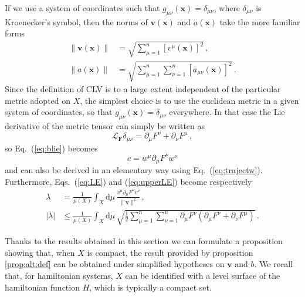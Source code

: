 \documentclass{article}
\theoremstyle{plain}
\theoremstyle{definition}
\theoremstyle{remark}
\newcommand{\vect}[1]{\boldsymbol{#1}}
\begin{document}
If we use a system of coordinates such that
$g_{\mu\nu}(\vect{x})=\delta_{\mu\nu}$, where $\delta_{\mu\nu}$ is
Kroenecker's symbol, then the norms of $\vect{v}(\vect{x})$ and
$a(\vect{x})$ take the more familiar forms
\begin{align}
\lVert \vect{v}(\vect{x})\rVert &= \sqrt{
\sum_{\mu=1}^n\left[v^\mu(\vect{x})\right]^2}\,, \label{eq:norme} \\
\lVert a(\vect{x})\rVert &= \sqrt{
\sum_{\mu=1}^n \sum_{\nu=1}^n
\left[a_{\mu\nu}(\vect{x})\right]^2}\,.
\end{align}
Since the definition of CLV is to a large extent
independent of the particular metric adopted on $X$, the simplest
choice is to use the euclidean metric
in a given system of coordinates, so that $g_{\mu\nu}(\vect{x})
=\delta_{\mu\nu}$ everywhere. In that case 
the Lie derivative of the metric tensor can simply be written as
\[
\mathcal{L}_{\vect{F}} \delta_{\mu\nu}=
\partial_\mu F^\nu + \partial_\nu F^\mu \,,
\]
so Eq.~(\ref{eq:blie}) becomes
\[
c=w^\mu \partial_\mu F^\nu w^\nu
\]
and can also be derived in an elementary way 
using Eq.~(\ref{eq:trajectw}). Furthermore,
Eqs.~(\ref{eq:LE}) and (\ref{eq:upperLE}) become respectively
\begin{align}
\lambda &=  \frac {1}{\mu(X)}
    \int_X \mathrm{d}\mu \,
\frac{v^\mu  \partial_\mu F^\nu v^\nu}
{\lVert \vect{v}\rVert^2} \, , \\
|\lambda| &\leq  \frac {1}{\mu(X)}
    \int_X \mathrm{d}\mu\,
\sqrt{\frac 12 \sum_{\mu=1}^n \sum_{\nu=1}^n \partial_\mu F^\nu
\left(\partial_\mu F^\nu + \partial_\nu F^\mu\right)}\, .
\end{align}

Thanks to the results obtained in this section
we can formulate a proposition showing that, when $X$
is compact, the result provided by proposition \ref{prop:alt:def}
can be obtained under simplified hypotheses on $\vect{v}$ and $b$.
We recall that,
for hamiltonian systems, $X$ can be identified with a level surface of
the hamiltonian function $H$, which is typically a compact set.
\end{document}
